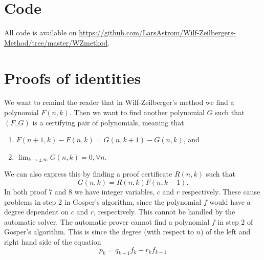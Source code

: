 \section{Code}
All code is available on \url{https://github.com/LarsAstrom/Wilf-Zeilbergers-Method/tree/master/WZmethod}.
\section{Proofs of identities}
We want to remind the reader that in Wilf-Zeilberger's method we find a polynomial $F(n,k)$. Then we want to find another polynomial $G$ such that $(F,G)$ is a certifying pair of polynomials, meaning that
\begin{enumerate}
  \item $F(n+1,k)-F(n,k)=G(n,k+1)-G(n,k)$, and
  \item $\lim_{k\to\pm\infty} G(n,k)=0, \forall n$.
\end{enumerate}
We can also express this by finding a proof certificate $R(n,k)$ such that
\begin{equation*}
  G(n,k)=R(n,k)F(n,k-1).
\end{equation*}
In both proof 7 and 8 we have integer variables, $c$ and $r$ respectively. These cause problems in step 2 in Gosper's algorithm, since the polynomial $f$ would have a degree dependent on $c$ and $r$, respectively. This cannot be handled by the automatic solver.
The automatic prover cannot find a polynomial $f$ in step 2 of Gosper's algorithm. This is since the degree (with respect to $n$) of the left and right hand side of the equation
\begin{equation}
  p_k=q_{k+1}f_k-r_kf_{k-1}
\end{equation}
